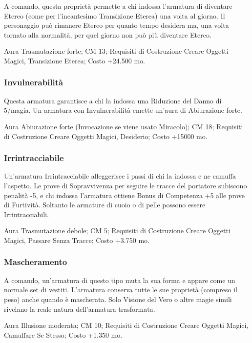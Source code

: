 \begin{multicols}{2}
A comando, questa proprietà permette a chi indossa l'armatura di diventare Etereo (come per l'incantesimo Transizione Eterea) una volta al giorno. Il personaggio può rimanere Etereo per quanto tempo desidera ma, una volta tornato alla normalità, per quel giorno non può più diventare Etereo.

Aura Trasmutazione forte; CM 13; Requisiti di Costruzione Creare Oggetti Magici, Transizione Eterea; Costo +24.500 mo.

\subsubsection{Invulnerabilità}

Questa armatura garantisce a chi la indossa una Riduzione del Danno di 5/magia. Un armatura con Invulnerabilità emette un'aura di Abiurazione forte.

Aura Abiurazione forte (Invocazione se viene usato Miracolo); CM 18; Requisiti di Costruzione Creare Oggetti Magici, Desiderio; Costo +15000 mo.

\subsubsection{Irrintracciabile}

Un'armatura Irrintracciabile alleggerisce i passi di chi la indossa e ne camuffa l'aspetto. Le prove di Sopravvivenza per seguire le tracce del portatore subiscono penalità -5, e chi indossa l'armatura ottiene Bonus di Competenza +5 alle prove di Furtività. Soltanto le armature di cuoio o di pelle possono essere Irrintracciabili.

Aura Trasmutazione debole; CM 5; Requisiti di Costruzione Creare Oggetti Magici, Passare Senza Tracce; Costo +3.750 mo.

\subsubsection{Mascheramento}

A comando, un'armatura di questo tipo muta la sua forma e appare come un normale set di vestiti. L'armatura conserva tutte le sue proprietà (compreso il peso) anche quando è mascherata. Solo Visione del Vero o altre magie simili rivelano la reale natura dell'armatura trasformata.

Aura Illusione moderata; CM 10; Requisiti di Costruzione Creare Oggetti Magici, Camuffare Se Stesso; Costo +1.350 mo.


\end{multicols}
